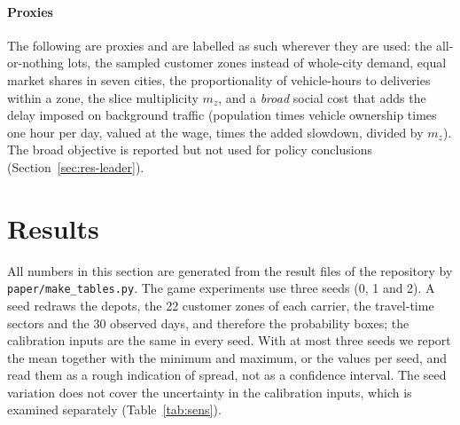 \documentclass[preprint,12pt]{elsarticle}
\theoremstyle{definition}
\theoremstyle{remark}
\begin{document}
\paragraph{Proxies} The following are proxies and are labelled as such wherever they are used: the all-or-nothing lots, the sampled customer zones instead of whole-city demand, equal market shares in seven cities, the proportionality of vehicle-hours to deliveries within a zone, the slice multiplicity $m_z$, and a \emph{broad} social cost that adds the delay imposed on background traffic (population times vehicle ownership times one hour per day, valued at the wage, times the added slowdown, divided by $m_z$). The broad objective is reported but not used for policy conclusions (Section~\ref{sec:res-leader}).

\section{Results}\label{sec:results}

All numbers in this section are generated from the result files of the repository by \texttt{paper/make\_tables.py}. The game experiments use three seeds (0, 1 and 2). A seed redraws the depots, the 22 customer zones of each carrier, the travel-time sectors and the 30 observed days, and therefore the probability boxes; the calibration inputs are the same in every seed. With at most three seeds we report the mean together with the minimum and maximum, or the values per seed, and read them as a rough indication of spread, not as a confidence interval. The seed variation does not cover the uncertainty in the calibration inputs, which is examined separately (Table~\ref{tab:sens}).
\end{document}
